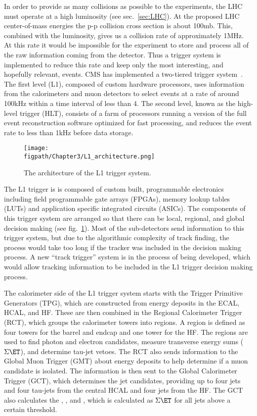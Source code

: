 In order to provide as many collisions as possible to the experiments, the LHC must operate at a high luminosity (see sec.~\ref{sec:LHC}).
At the proposed LHC center-of-mass energies the p-p collision cross section is about 100\unit{mb}.
This, combined with the luminosity, gives us a collision rate of approximately 1\unit{MHz}.
At this rate it would be impossible for the experiment to store and process all of the raw information coming from the detector.
Thus a trigger system is implemented to reduce this rate and keep only the most interesting, and hopefully relevant, events.
CMS has implemented a two-tiered trigger system~\cite{Khachatryan:2016bia}.
The first level (L1), composed of custom hardware processors, uses information from the calorimeters and muon detectors to select events at a rate of around 100\unit{kHz} within a time interval of less than 4\mus.
The second level, known as the high-level trigger (HLT), consists of a farm of processors running a version of the full event reconstruction software optimized for fast processing, and reduces the event rate to less than 1\unit{kHz} before data storage.

\begin{figure}[!hbt]
    \centering
    \texttt{[image: \\figpath/Chapter3/L1\_architecture.png]}
    \caption{The architecture of the L1 trigger system.}
    \label{fig:CMS_L1_architecture}
\end{figure}

The L1 trigger is is composed of custom built, programmable electronics including field programmable gate arrays (FPGAs), memory lookup tables (LUTs) and application specific integrated circuits (ASICs).
The components of this trigger system are arranged so that there can be local, regional, and global decision making (see fig.~\ref{fig:CMS_L1_architecture}).
Most of the sub-detectors send information to this trigger system, but due to the algorithmic complexity of track finding, the process would take too long if the tracker was included in the decision making process.
A new ``track trigger'' system is in the process of being developed, which would allow tracking information to be included in the L1 trigger decision making process.

The calorimeter side of the L1 trigger system starts with the Trigger Primitive Generators (TPG), which are constructed from energy deposits in the ECAL, HCAL, and HF.
These are then combined in the Regional Calorimeter Trigger (RCT), which groups the calorimeter towers into regions.
A region is defined as four towers for the barrel and endcap and one tower for the HF.
The regions are used to find photon and electron candidates, measure transverse energy sums ($\Sigma\ET$), and determine tau-jet vetoes.
The RCT also sends information to the Global Muon Trigger (GMT) about energy deposits to help determine if a muon candidate is isolated.
The information is then sent to the Global Calorimeter Trigger (GCT), which determines the jet candidates, providing up to four jets and four tau-jets from the central HCAL and four jets from the HF.
The GCT also calculates the \ET, \ETslash, and \HT, which is calculated as $\Sigma\ET$ for all jets above a certain threshold.

